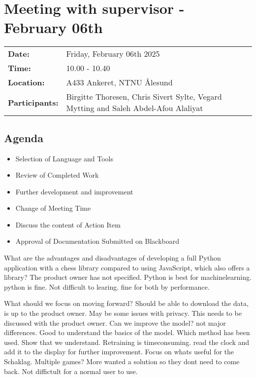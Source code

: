 \section{Meeting with supervisor - February 06th}
\begin{tabular}{ll}
    \textbf{Date:} & Friday, February 06th 2025 \\
    \textbf{Time:} & 10.00 - 10.40\\
    \textbf{Location:} & A433 Ankeret, NTNU Ålesund \\
    \textbf{Participants:} & Birgitte Thoresen, Chris Sivert Sylte, Vegard Mytting and Saleh Abdel-Afou Alaliyat\\
\end{tabular}

\vspace{0.5cm}

\subsection{Agenda}

\begin{itemize}
    \item Selection of Language and Tools
    \item Review of Completed Work
    \item Further development and improvement
    \item Change of Meeting Time
    \item Discuss the content of Action Item
    \item Approval of Documentation Submitted on Blackboard
\end{itemize}

What are the advantages and disadvantages of developing a full Python application with a chess library compared to using JavaScript, which also offers a library? The product owner has not specified. Python is best for machinelearning. python is fine. Not difficult to learing. fine for both by performance. 

What should we focus on moving forward? Should be able to download the data, is up to the product owner. May be some issues with privacy. This needs to be discussed with the product owner. Can we improve the model? not major differences. Good to understand the basics of the model. Which method has been used. Show that we understand. Retraining is timeconsuming. read the clock and add it to the display for further improvement. Focus on whats useful for the Schaklag. Multiple games? More wanted a solution so they dont need to come back. Not diffictult for a normal user to use. 

